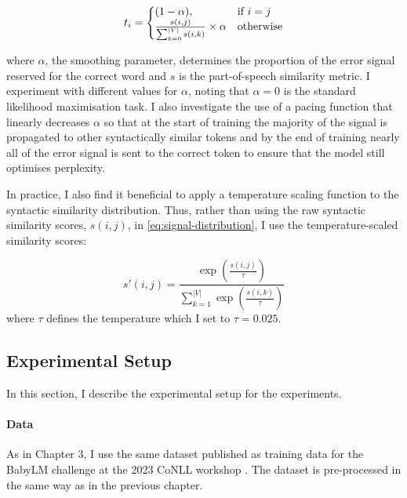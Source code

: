 \begin{equation}
\label{eq:signal-distribution}
    t_i=\left\{
  \begin{array}{@{}ll@{}}
    (1-\alpha), & \text{if}\ i=j \\
    \frac{s(i,j)}{\sum_{k=0}^{|V|}{s(i,k)}} \times \alpha & \text{otherwise}
  \end{array}\right.
\end{equation}

\noindent

where $\alpha$, the smoothing parameter, determines the proportion of the error signal reserved for the correct word and $s$ is the part-of-speech similarity metric. I experiment with different values for $\alpha$, noting that $\alpha=0$ is the standard likelihood maximisation task. I also investigate the use of a pacing function that linearly decreases $\alpha$ so that at the start of training the majority of the signal is propagated to other syntactically similar tokens and by the end of training nearly all of the error signal is sent to the correct token to ensure that the model still optimises perplexity. 

In practice, I also find it beneficial to apply a temperature scaling function to the syntactic similarity distribution. Thus, rather than using the raw syntactic similarity scores, $s(i,j)$, in \cref{eq:signal-distribution}, I use the temperature-scaled similarity scores:

$$
s'(i,j) = \frac{\exp\left(\frac{s(i,j)}{\tau}\right)}{\sum_{k=1}^{|V|} \exp\left(\frac{s(i,k)}{\tau}\right)}
$$
where $\tau$ defines the temperature which I set to $\tau=0.025$.

\subsection{Experimental Setup}
\label{subsection:experimental_setup}

In this section, I describe the experimental setup for the \smoothing experiments.


\paragraph{Data} \label{paragraph:data} As in Chapter 3, I use the same dataset published as training data for the BabyLM challenge at the 2023 CoNLL workshop \citep{warstadt2023babylm1}. The dataset is pre-processed in the same way as in the previous chapter. 

